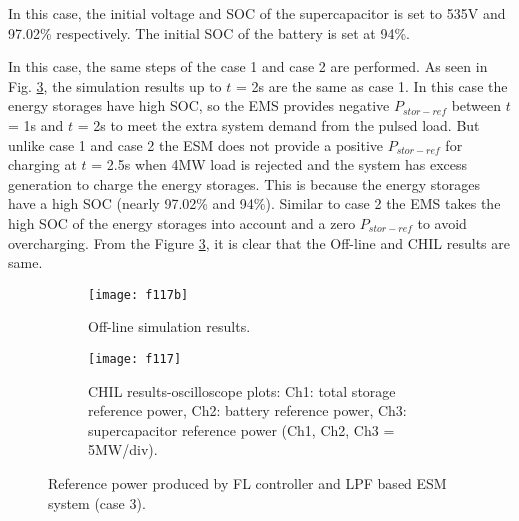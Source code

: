 In this case, the initial voltage and SOC of the supercapacitor is set to 535V and 97.02\% respectively. The initial SOC of the battery is set at 94\%. 

In this case, the same steps of the case 1 and case 2 are performed. As seen in Fig. \ref{ch5_f117}, the simulation results up to $t$ = 2s are the same as case 1. In this case the energy storages have high SOC, so the EMS provides negative $P_{stor-ref}$ between $t$ = 1s and $t$ = 2s to meet the extra system demand from the pulsed load. But unlike case 1 and case 2 the ESM does not provide a positive $P_{stor-ref}$ for charging at $t$ = 2.5s when 4MW load is rejected and the system has excess generation to charge the energy storages. This is because the energy storages have a high SOC (nearly 97.02\% and 94\%). Similar to case 2 the EMS takes the high SOC of the energy storages into account and a zero $P_{stor-ref}$ to avoid overcharging. From the Figure \ref{ch5_f117}, it is clear that the Off-line and CHIL results are same.
  
\begin{figure}[ht!]
\begin{subfigure}{1\columnwidth}
\begin{center}
\texttt{[image: f117b]}
\end{center}
\caption{Off-line simulation results.}
\label{ch5_f117b}
\end{subfigure}
\begin{subfigure}{1\columnwidth}
\begin{center}
\texttt{[image: f117]}
\end{center}
\caption{CHIL results-oscilloscope plots: Ch1: total storage reference power, Ch2: battery reference power, Ch3: supercapacitor reference  power (Ch1, Ch2, Ch3 = 5MW/div).}
\label{ch5_f117a}
\end{subfigure}
\caption{Reference power produced by FL controller and LPF based ESM system (case 3).}
\label{ch5_f117}
\end{figure}



